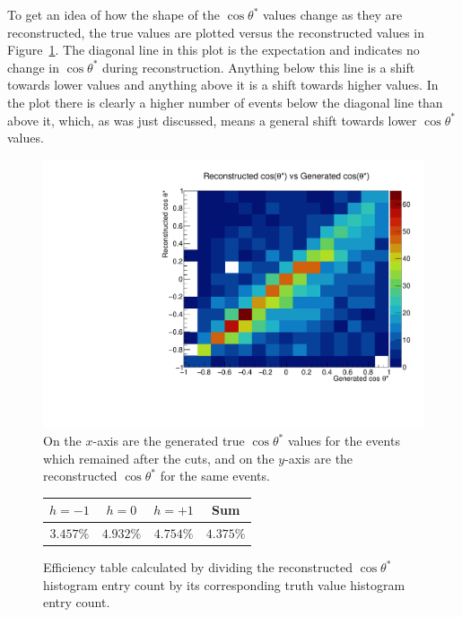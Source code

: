 \documentclass[12pt,a4paper]{article}
\numberwithin{equation}{section}
\begin{document}
To get an idea of how the shape of the $\cos \theta^*$ values change as they are
reconstructed, the true values are plotted versus the reconstructed values in
Figure~\ref{fig:2dhist}. The diagonal line in this plot is the expectation and
indicates no change in $\cos \theta^*$ during reconstruction. Anything below this
line is a shift towards lower values and anything above it is a shift towards
higher values. In the plot there is clearly a higher number of events below the
diagonal line than above it, which, as was just discussed, means a general shift
towards lower $\cos \theta^*$ values.
\begin{figure}[H]
  \centering
  \includegraphics[width=0.6\linewidth]{figures/2dhist}
  \caption{\label{fig:2dhist} On the $x$-axis are the generated true $\cos \theta^*$ values for
    the events which remained after the cuts, and on the $y$-axis are the
    reconstructed $\cos \theta^*$ for the same events.}
\end{figure}


\begin{figure}[ht]
  \centering
  \begin{tabular}[H]{|c|c|c|c|}
    \hline
    $h=-1$    & $h=0$     & $h=+1$    & Sum       \\\hline
    $3.457\%$ & $4.932\%$ & $4.754\%$ & $4.375\%$ \\\hline
  \end{tabular}
  \caption{\label{fig:delphesefficiency}Efficiency table calculated by dividing
    the reconstructed $\cos \theta^*$ histogram entry count by its corresponding truth value histogram entry
    count.}
\end{figure}
\end{document}
